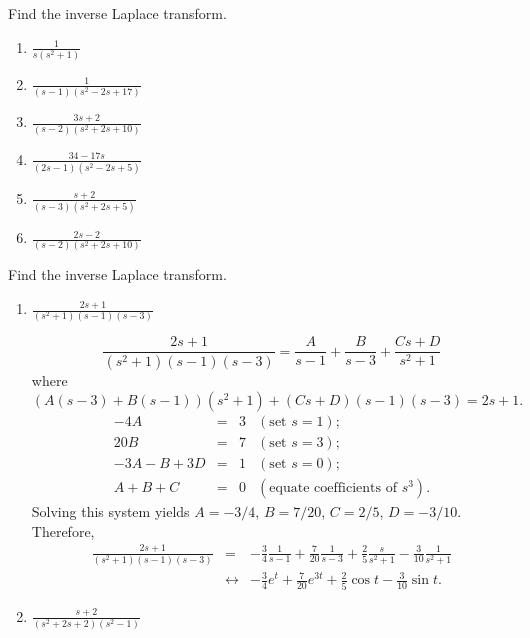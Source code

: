 \documentclass{ximera}
\begin{document}
\begin{problem}\label{exer:8.2.7}
Find the inverse Laplace transform.

\begin{enumerate}
    \item $\frac{1}{s(s^2+1)}$
    \item $\frac{1}{(s-1)(s^2-2s+17)}$
    \item $\frac{3s+2}{(s-2)(s^2+2s+10)}$
    \item $\frac{34-17s}{(2s-1)(s^2-2s+5)}$
    \item $\frac{s+2}{(s-3)(s^2+2s+5)}$
    \item $\frac{2s-2}{(s-2)(s^2+2s+10)}$
\end{enumerate}
\end{problem}

\begin{problem}\label{exer:8.2.8}
 Find the inverse Laplace transform.
\begin{enumerate}
\item $\frac{2s+1}{(s^2+1)(s-1)(s-3)}$

\begin{solution}
$$
\frac{2s+1}{(s^2+1)(s-1)(s-3)}
=\frac{A}{s-1}+\frac{B}{s-3}+\frac{Cs+D}{s^2+1}
$$
where
$$
(A(s-3)+B(s-1))(s^2+1)+(Cs+D)(s-1)(s-3)=2s+1.
$$
$$
\begin{array}{rcrl}
-4A&=&3&(\mbox{set }s=1);\\
20B&=&7& (\mbox{set }s=3);\\
-3A-B+3D&=&1& (\mbox{set }s=0);\\
A+B+C&=&0&(\mbox{equate coefficients of }s^3).
\end{array}
$$
Solving this system yields $A=-3/4$, $B=7/20$,
$C=2/5$, $D=-3/10$. Therefore,
\begin{eqnarray*}
\frac{2s+1}{(s^2+1)(s-1)(s-3)}
&=&
-\frac{3}{4}\frac{1}{s-1}+\frac{7}{20}\frac{1}{s-3}+\frac{2}{5}\frac{s}{s^2+1}-\frac{3}{10}\frac{1}{s^2+1}
\\&\leftrightarrow&
-\frac{3}{4}e^t+\frac{7}{20}e^{3t}+\frac{2}{5}\cos t-\frac{3}{10}\sin t.
\end{eqnarray*}
\end{solution}

\item $\frac{s+2}{(s^2+2s+2)(s^2-1)}$




\end{enumerate}
\end{problem}
\end{document}
